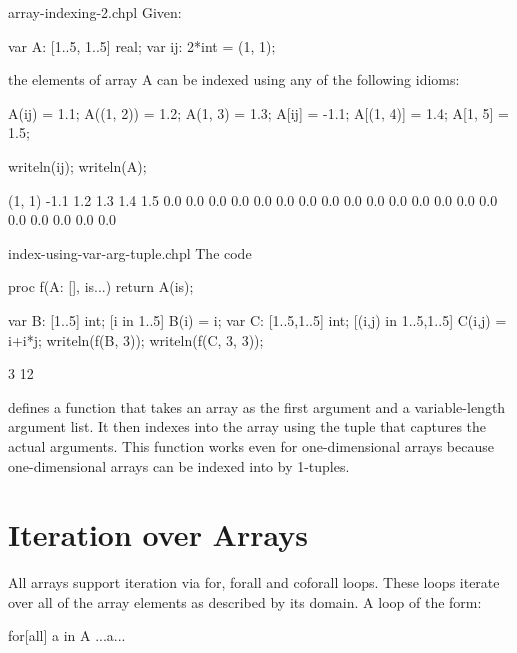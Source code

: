 \begin{chapelexample}{array-indexing-2.chpl}
Given:
\begin{chapel}
var A: [1..5, 1..5] real;
var ij: 2*int = (1, 1);
\end{chapel}
the elements of array A can be indexed using any of the following
idioms:
\begin{chapel}
A(ij) = 1.1;
A((1, 2)) = 1.2;
A(1, 3) = 1.3;
A[ij] = -1.1;
A[(1, 4)] = 1.4;
A[1, 5] = 1.5;
\end{chapel}
\begin{chapelpost}
writeln(ij);
writeln(A);
\end{chapelpost}
\begin{chapeloutput}
(1, 1)
-1.1 1.2 1.3 1.4 1.5
0.0 0.0 0.0 0.0 0.0
0.0 0.0 0.0 0.0 0.0
0.0 0.0 0.0 0.0 0.0
0.0 0.0 0.0 0.0 0.0
\end{chapeloutput}
\end{chapelexample}

\begin{chapelexample}{index-using-var-arg-tuple.chpl}
The code
\begin{chapel}
proc f(A: [], is...)
  return A(is);
\end{chapel}
\begin{chapelpost}
var B: [1..5] int;
[i in 1..5] B(i) = i;
var C: [1..5,1..5] int;
[(i,j) in {1..5,1..5}] C(i,j) = i+i*j;
writeln(f(B, 3));
writeln(f(C, 3, 3));
\end{chapelpost}
\begin{chapeloutput}
3
12
\end{chapeloutput}
defines a function that takes an array as the first argument and a
variable-length argument list.  It then indexes into the array using
the tuple that captures the actual arguments.  This function works
even for one-dimensional arrays because one-dimensional arrays can be
indexed into by 1-tuples.
\end{chapelexample}


\section{Iteration over Arrays}
\label{Iteration_over_Arrays}

All arrays support iteration via for, forall and coforall loops.
These loops iterate over all of the array elements as described by its
domain.  A loop of the form:

\begin{chapel}
[co]for[all] a in A
  ...a...
\end{chapel}

